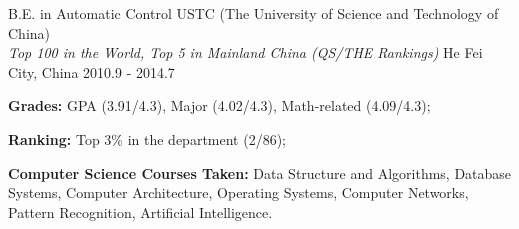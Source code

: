 \begin{cventries}
  \cventry%
    {B.E. in Automatic Control}%
    {USTC (The University of Science and Technology of China) \\ {\fontsize{10pt}{1em}\itshape Top 100 in the World, Top 5 in Mainland China (QS/THE Rankings)}}%
    {He Fei City, China}%
    {2010.9 - 2014.7}%
    {
      \begin{cvitems}
        \item \textbf{Grades:} GPA (3.91/4.3), Major (4.02/4.3), Math-related (4.09/4.3);
        \item \textbf{Ranking:} Top 3\% in the department (2/86);
        \item \textbf{Computer Science Courses Taken:} Data Structure and Algorithms, Database Systems, Computer Architecture, Operating Systems, Computer Networks, Pattern Recognition, Artificial Intelligence.
      \end{cvitems}
    }
\end{cventries}
